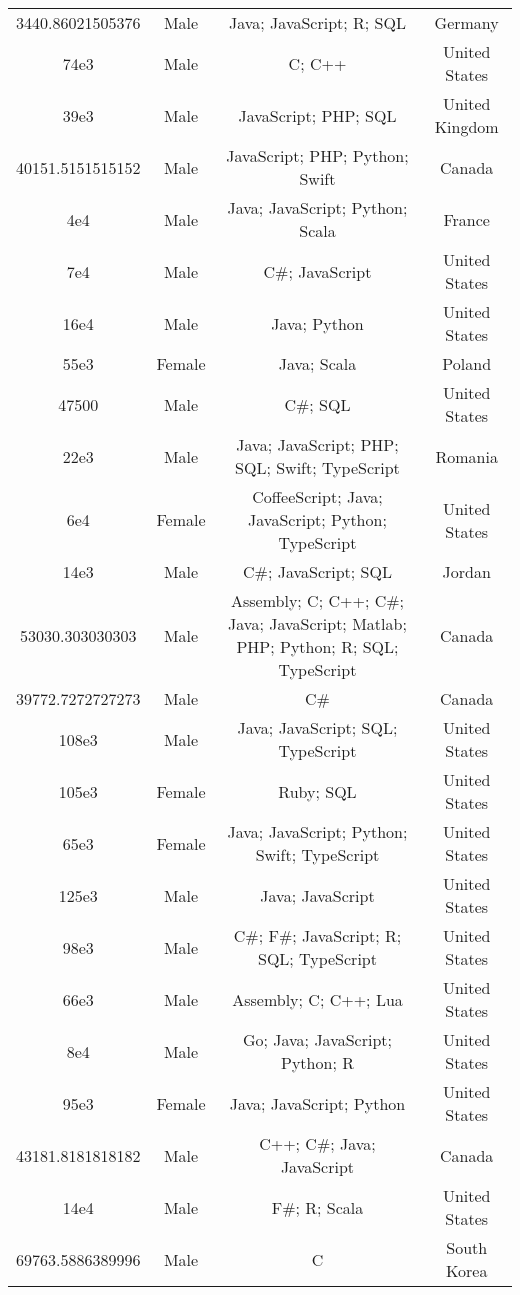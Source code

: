 \begin{center}
\begin{tabular}{ |c|c|c|c| }
3440.86021505376  &  Male  &  Java; JavaScript; R; SQL  &  Germany  \\ 
74e3  &  Male  &  C; C++  &  United States  \\ 
39e3  &  Male  &  JavaScript; PHP; SQL  &  United Kingdom  \\ 
40151.5151515152  &  Male  &  JavaScript; PHP; Python; Swift  &  Canada  \\ 
4e4  &  Male  &  Java; JavaScript; Python; Scala  &  France  \\ 
7e4  &  Male  &  C\#; JavaScript  &  United States  \\ 
16e4  &  Male  &  Java; Python  &  United States  \\ 
55e3  &  Female  &  Java; Scala  &  Poland  \\ 
47500  &  Male  &  C\#; SQL  &  United States  \\ 
22e3  &  Male  &  Java; JavaScript; PHP; SQL; Swift; TypeScript  &  Romania  \\ 
6e4  &  Female  &  CoffeeScript; Java; JavaScript; Python; TypeScript  &  United States  \\ 
14e3  &  Male  &  C\#; JavaScript; SQL  &  Jordan  \\ 
53030.303030303  &  Male  &  Assembly; C; C++; C\#; Java; JavaScript; Matlab; PHP; Python; R; SQL; TypeScript  &  Canada  \\ 
39772.7272727273  &  Male  &  C\#  &  Canada  \\ 
108e3  &  Male  &  Java; JavaScript; SQL; TypeScript  &  United States  \\ 
105e3  &  Female  &  Ruby; SQL  &  United States  \\ 
65e3  &  Female  &  Java; JavaScript; Python; Swift; TypeScript  &  United States  \\ 
125e3  &  Male  &  Java; JavaScript  &  United States  \\ 
98e3  &  Male  &  C\#; F\#; JavaScript; R; SQL; TypeScript  &  United States  \\ 
66e3  &  Male  &  Assembly; C; C++; Lua  &  United States  \\ 
8e4  &  Male  &  Go; Java; JavaScript; Python; R  &  United States  \\ 
95e3  &  Female  &  Java; JavaScript; Python  &  United States  \\ 
43181.8181818182  &  Male  &  C++; C\#; Java; JavaScript  &  Canada  \\ 
14e4  &  Male  &  F\#; R; Scala  &  United States  \\ 
69763.5886389996  &  Male  &  C  &  South Korea  \\ 

\end{tabular}
\end{center}
